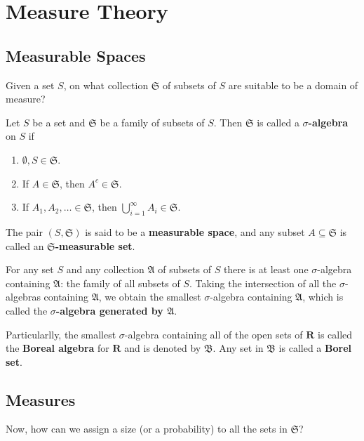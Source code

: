 \chapter{Measure Theory}

\section{Measurable Spaces}

Given a set $S$, on what collection $\mathfrak{S}$ of subsets of $S$ are suitable to be a domain of measure?

\begin{definition}[]{}{}
	Let $S$ be a set and $\mathfrak{S}$ be a family of subsets of $S$. Then $\mathfrak{S}$ is called a \textbf{$\sigma$-algebra} on $S$ if
	\begin{enumerate}
		\item $\emptyset, S \in \mathfrak{S}$.
		\item If $A \in \mathfrak{S}$, then $A^c \in \mathfrak{S}$.
		\item If $A_1, A_2, \ldots \in \mathfrak{S}$, then $\bigcup_{i=1}^\infty A_i \in \mathfrak{S}$.
	\end{enumerate}

	The pair $(S, \mathfrak{S})$ is said to be a \textbf{measurable space}, and any subset $A \subseteq \mathfrak{S}$ is called an \textbf{$\mathfrak{S}$-measurable set}.
\end{definition}

For any set $S$ and any collection $\mathfrak{A}$ of subsets of $S$ there is at least one $\sigma$-algebra containing $\mathfrak{A}$: the family of all subsets of $S$. Taking the intersection of all the $\sigma$-algebras containing $\mathfrak{A}$, we obtain the smallest $\sigma$-algebra containing $\mathfrak{A}$, which is called the \textbf{$\sigma$-algebra generated by $\mathfrak{A}$}.

Particularlly, the smallest $\sigma$-algebra containing all of the open sets of $\textbf{R}$ is called the \textbf{Boreal algebra} for $\textbf{R}$ and is denoted by $\mathfrak{B}$. Any set in $\mathfrak{B}$ is called a \textbf{Borel set}.

\section{Measures}

Now, how can we assign a size (or a probability) to all the sets in $\mathfrak{S}$?

